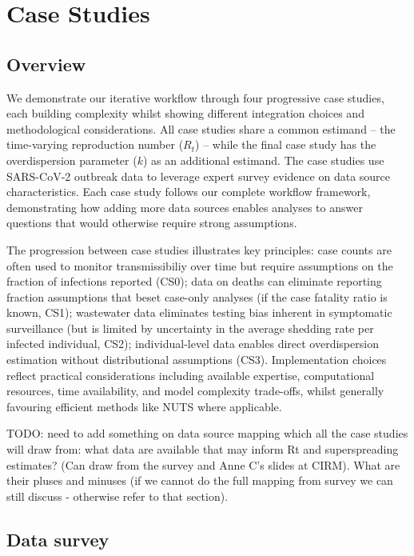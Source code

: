 \documentclass{article}
\begin{document}
\section{Case Studies}

\subsection{Overview}

We demonstrate our iterative workflow through four progressive case studies, each building complexity whilst showing different integration choices and methodological considerations.
All case studies share a common estimand -- the time-varying reproduction number ($R_t$) -- while the final case study has the overdispersion parameter ($k$) as an additional estimand. The case studies use SARS-CoV-2 outbreak data to leverage expert survey evidence on data source characteristics.
Each case study follows our complete workflow framework, demonstrating how adding more data sources enables analyses to answer questions that would otherwise require strong assumptions.

The progression between case studies illustrates key principles: case counts are often used to monitor transmissibiliy over time but require assumptions on the fraction of infections reported (CS0); data on deaths can eliminate reporting fraction assumptions that beset case-only analyses (if the case fatality ratio is known, CS1); wastewater data eliminates testing bias inherent in symptomatic surveillance (but is limited by uncertainty in the average shedding rate per infected individual, CS2); individual-level data enables direct overdispersion estimation without distributional assumptions (CS3).
Implementation choices reflect practical considerations including available expertise, computational resources, time availability, and model complexity trade-offs, whilst generally favouring efficient methods like NUTS where applicable.

TODO: need to add something on data source mapping which all the case studies will draw from: what data are available that may inform Rt and superspreading estimates? (Can draw from the survey and Anne C's slides at CIRM). What are their pluses and minuses (if we cannot do the full mapping from survey we can still discuss - otherwise refer to that section).

\subsection{Data survey}
\end{document}
